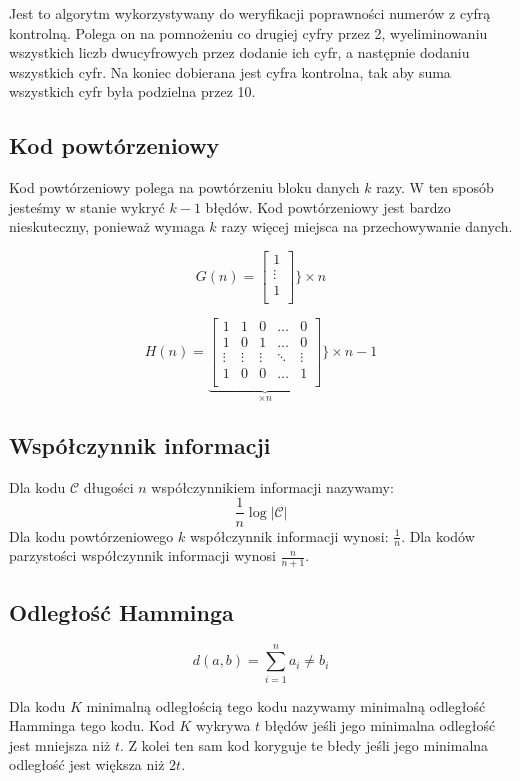 \documentclass{../notatki}
\begin{document}
Jest to algorytm wykorzystywany do weryfikacji poprawności numerów z cyfrą
kontrolną. Polega on na pomnożeniu co drugiej cyfry przez 2, wyeliminowaniu
wszystkich liczb dwucyfrowych przez dodanie ich cyfr, a następnie
dodaniu wszystkich cyfr. Na koniec dobierana jest cyfra kontrolna, tak aby
suma wszystkich cyfr była podzielna przez 10.

\subsection{Kod powtórzeniowy}

Kod powtórzeniowy polega na powtórzeniu bloku danych $k$ razy. W ten sposób
jesteśmy w stanie wykryć $k-1$ błędów. Kod powtórzeniowy jest bardzo
nieskuteczny, ponieważ wymaga $k$ razy więcej miejsca na przechowywanie
danych.

$$
G(n) =
\begin{bmatrix}
  1 \\
  \vdots \\
  1 \\
\end{bmatrix}
\Bigg \rbrace \times n
$$

$$
H(n) =
\underbrace{
  \begin{bmatrix}
    1 & 1 & 0 & \dots & 0 \\
    1 & 0 & 1 & \dots & 0 \\
    \vdots & \vdots & \vdots & \ddots & \vdots \\
    1 & 0 & 0 & \dots & 1 \\
  \end{bmatrix}
}_{\times n}
\Bigg \rbrace \times n - 1
$$

\subsection{Współczynnik informacji}

Dla kodu $\mathcal{C}$ długości $n$ współczynnikiem informacji nazywamy:
$$
\frac{1}{n}\log|\mathcal{C}|
$$
Dla kodu powtórzeniowego $k$ współczynnik informacji wynosi: $\frac{1}{n}$.
Dla kodów parzystości współczynnik informacji wynosi $\frac{n}{n+1}$.

\subsection{Odległość Hamminga}

$$
d(a, b) = \sum_{i = 1}^{n} a_i \ne b_i
$$

Dla kodu $K$ minimalną odległością tego kodu nazywamy minimalną odległość
Hamminga tego kodu. Kod $K$ wykrywa $t$ błędów jeśli jego minimalna odległość
jest mniejsza niż $t$. Z kolei ten sam kod koryguje te błedy jeśli jego
minimalna odległość jest większa niż $2t$.
\end{document}
